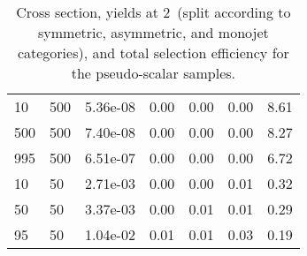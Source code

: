 \begin{table}
\begin{tabular}{lllllll}
10        &   500       &   5.36e-08  &   0.00      &   0.00      &   0.00      &   8.61      \\ 
500       &   500       &   7.40e-08  &   0.00      &   0.00      &   0.00      &   8.27      \\ 
995       &   500       &   6.51e-07  &   0.00      &   0.00      &   0.00      &   6.72      \\ 
10        &   50        &   2.71e-03  &   0.00      &   0.00      &   0.01      &   0.32      \\ 
50        &   50        &   3.37e-03  &   0.00      &   0.01      &   0.01      &   0.29      \\ 
95        &   50        &   1.04e-02  &   0.01      &   0.01      &   0.03      &   0.19      \\ 
\hline
\end{tabular}
\caption{Cross section, yields at 2~\ifb (split according to symmetric, asymmetric, and monojet categories), and total selection efficiency for the pseudo-scalar \DMtt samples.}
\label{tab:dm_DMttP_g1_2fb}
\end{table}
